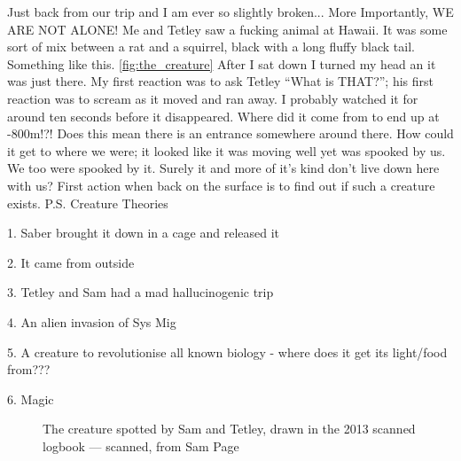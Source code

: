 Just back from our trip and I am ever so slightly broken...
More Importantly, WE ARE NOT ALONE! Me and Tetley saw a fucking animal at Hawaii. It was some sort of mix between a rat and a squirrel, black with a long fluffy black tail. Something like this. \ref{fig:the_creature}
After I sat down I turned my head an it was just there. My first reaction was to ask Tetley “What is THAT?”; his first reaction was to scream as it moved and ran away. I probably watched it for around ten seconds before it disappeared. Where did it come from to end up at -800m!?! Does this mean there is an entrance somewhere around there. How could it get to where we were; it looked like it was moving well yet was spooked by us. We too were spooked by it. Surely it and more of it’s kind don’t live down here with us? First action when back on the surface is to find out if such a creature exists.
P.S. Creature Theories
\begin{citemize}
\item 1. Saber brought it down in a cage and released it
\item 2. It came from outside
\item 3. Tetley and Sam had a mad hallucinogenic trip
\item 4. An alien invasion of Sys Mig
\item 5. A creature to revolutionise all known biology - where does it get its light/food from???
\item 6. Magic
\end{citemize}

\begin{figure}[t!]
	\checkoddpage \ifoddpage \forcerectofloat \else \forceversofloat \fi
	\centering
	\caption{The creature spotted by Sam and Tetley, drawn in the 2013 scanned logbook --- scanned, from Sam Page}
	\label{the_creature}
\end{figure}


